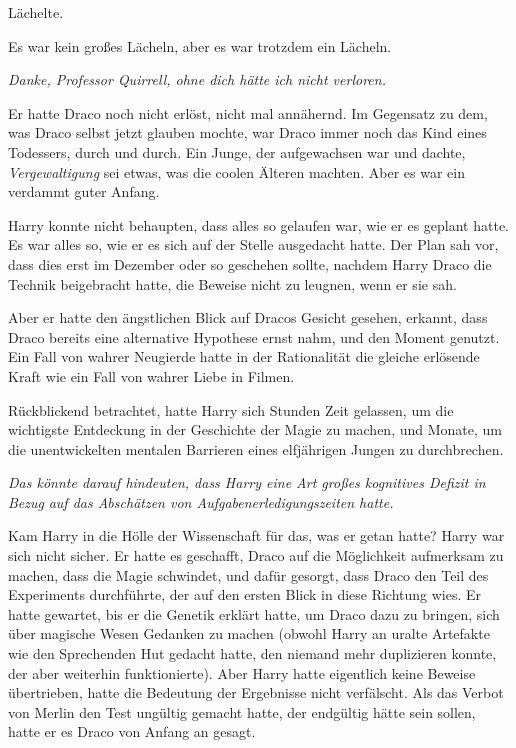 Lächelte.

Es war kein großes Lächeln, aber es war trotzdem ein Lächeln.

\emph{Danke, Professor Quirrell, ohne dich hätte ich nicht verloren.}

Er hatte Draco noch nicht erlöst, nicht mal annähernd. Im Gegensatz zu dem, was
Draco selbst jetzt glauben mochte, war Draco immer noch das Kind eines
Todessers, durch und durch. Ein Junge, der aufgewachsen war und dachte, \glqq
\emph{Vergewaltigung}\grqq{} sei etwas, was die coolen Älteren machten. Aber es
war ein verdammt guter Anfang.

Harry konnte nicht behaupten, dass alles so gelaufen war, wie er es geplant
hatte. Es war alles so, wie er es sich auf der Stelle ausgedacht hatte. Der Plan
sah vor, dass dies erst im Dezember oder so geschehen sollte, nachdem Harry
Draco die Technik beigebracht hatte, die Beweise nicht zu leugnen, wenn er sie
sah.

Aber er hatte den ängstlichen Blick auf Dracos Gesicht gesehen, erkannt, dass
Draco bereits eine alternative Hypothese ernst nahm, und den Moment genutzt. Ein
Fall von wahrer Neugierde hatte in der Rationalität die gleiche erlösende Kraft
wie ein Fall von wahrer Liebe in Filmen.

Rückblickend betrachtet, hatte Harry sich Stunden Zeit gelassen, um die
wichtigste Entdeckung in der Geschichte der Magie zu machen, und Monate, um die
unentwickelten mentalen Barrieren eines elfjährigen Jungen zu durchbrechen.

\emph{Das könnte darauf hindeuten, dass Harry eine Art großes kognitives Defizit
in Bezug} \emph{auf das Abschätzen von Aufgabenerledigungszeiten hatte.}

Kam Harry in die Hölle der Wissenschaft für das, was er getan hatte? Harry war
sich nicht sicher. Er hatte es geschafft, Draco auf die Möglichkeit aufmerksam
zu machen, dass die Magie schwindet, und dafür gesorgt, dass Draco den Teil des
Experiments durchführte, der auf den ersten Blick in diese Richtung wies. Er
hatte gewartet, bis er die Genetik erklärt hatte, um Draco dazu zu bringen, sich
über magische Wesen Gedanken zu machen (obwohl Harry an uralte Artefakte wie den
Sprechenden Hut gedacht hatte, den niemand mehr duplizieren konnte, der aber
weiterhin funktionierte). Aber Harry hatte eigentlich keine Beweise übertrieben,
hatte die Bedeutung der Ergebnisse nicht verfälscht. Als das Verbot von Merlin
den Test ungültig gemacht hatte, der endgültig hätte sein sollen, hatte er es
Draco von Anfang an gesagt.

